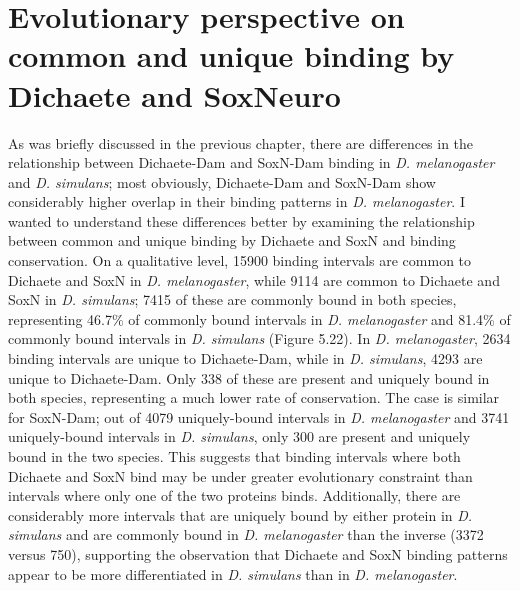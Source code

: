 \section{Evolutionary perspective on common and unique binding by Dichaete and SoxNeuro}
As was briefly discussed in the previous chapter, there are differences in the relationship between Dichaete-Dam and SoxN-Dam binding in \emph{D. melanogaster} and \emph{D. simulans}; most obviously, Dichaete-Dam and SoxN-Dam show considerably higher overlap in their binding patterns in \emph{D. melanogaster}. I wanted to understand these differences better by examining the relationship between common and unique binding by Dichaete and SoxN and binding conservation. On a qualitative level, 15900 binding intervals are common to Dichaete and SoxN in \emph{D. melanogaster}, while 9114 are common to Dichaete and SoxN in \emph{D. simulans}; 7415 of these are commonly bound in both species, representing 46.7\% of commonly bound intervals in \emph{D. melanogaster} and 81.4\% of commonly bound intervals in \emph{D. simulans} (Figure 5.22). In \emph{D. melanogaster}, 2634 binding intervals are unique to Dichaete-Dam, while in \emph{D. simulans}, 4293 are unique to Dichaete-Dam. Only 338 of these are present and uniquely bound in both species, representing a much lower rate of conservation. The case is similar for SoxN-Dam; out of 4079 uniquely-bound intervals in \emph{D. melanogaster} and 3741 uniquely-bound intervals in \emph{D. simulans}, only 300 are present and uniquely bound in the two species. This suggests that binding intervals where both Dichaete and SoxN bind may be under greater evolutionary constraint than intervals where only one of the two proteins binds. Additionally, there are considerably more intervals that are uniquely bound by either protein in \emph{D. simulans} and are commonly bound in \emph{D. melanogaster} than the inverse (3372 versus 750), supporting the observation that Dichaete and SoxN binding patterns appear to be more differentiated in \emph{D. simulans} than in \emph{D. melanogaster}.\\

